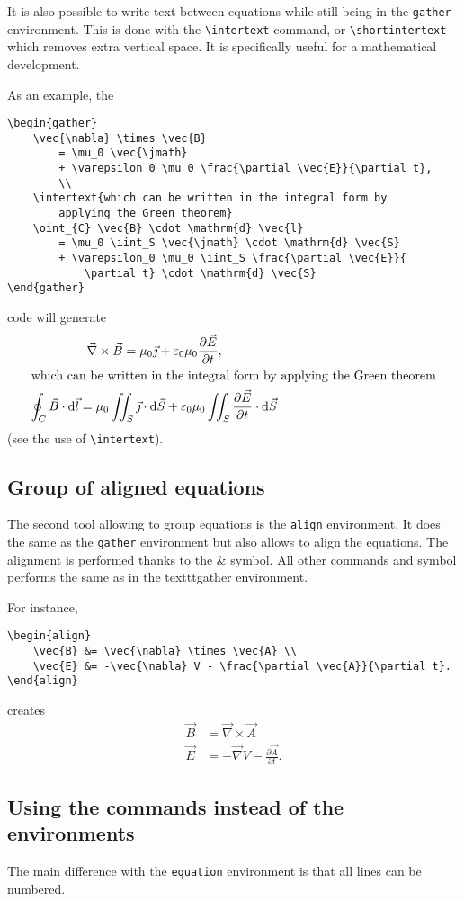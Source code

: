 		It is also possible to write text between equations while still being in the \texttt{gather} environment.
		This is done with the \texttt{\textbackslash{}intertext} command, or \texttt{\textbackslash{}shortintertext} which removes extra vertical space.
		It is specifically useful for a mathematical development.
		
		As an example, the	
\begin{lstlisting}[language={[LaTeX]TeX}]
\begin{gather}
	\vec{\nabla} \times \vec{B}
		= \mu_0 \vec{\jmath}
		+ \varepsilon_0 \mu_0 \frac{\partial \vec{E}}{\partial t},
		\\
	\intertext{which can be written in the integral form by 
		applying the Green theorem}
	\oint_{C} \vec{B} \cdot \mathrm{d} \vec{l}
		= \mu_0 \iint_S \vec{\jmath} \cdot \mathrm{d} \vec{S}
		+ \varepsilon_0 \mu_0 \iint_S \frac{\partial \vec{E}}{
			\partial t}	\cdot \mathrm{d} \vec{S}
\end{gather}
\end{lstlisting}	
		code will generate
		\begin{gather}
			\vec{\nabla} \times \vec{B}
				= \mu_0 \vec{\jmath}
				+ \varepsilon_0 \mu_0 \frac{\partial \vec{E}}{\partial t},
				\\
			\intertext{which can be written in the integral form by applying the Green theorem}
			\oint_{C} \vec{B} \cdot \mathrm{d} \vec{l}
				= \mu_0 \iint_S \vec{\jmath} \cdot \mathrm{d} \vec{S}
				+ \varepsilon_0 \mu_0 \iint_S \frac{\partial \vec{E}}{\partial t} \cdot \mathrm{d} \vec{S}
		\end{gather}
		(see the use of \texttt{\textbackslash{}intertext}).
	
	
	\subsection{Group of aligned equations}
	
		The second tool allowing to group equations is the \texttt{align} environment.
		It does the same as the \texttt{gather} environment but also allows to align the equations.
		The alignment is performed thanks to the \& symbol.
		All other commands and symbol performs the same as in the texttt{gather} environment.
		
		For instance,
\begin{lstlisting}[language={[LaTeX]TeX}]
\begin{align}
	\vec{B} &= \vec{\nabla} \times \vec{A} \\
	\vec{E} &= -\vec{\nabla} V - \frac{\partial \vec{A}}{\partial t}.
\end{align}
\end{lstlisting}
		creates
		\begin{align}
			\vec{B} &= \vec{\nabla} \times \vec{A} \\
			\vec{E} &= -\vec{\nabla} V - \frac{\partial \vec{A}}{\partial t}.
		\end{align}
	
	
	\subsection{Using the commands instead of the environments}
	
		The main difference with the \texttt{equation} environment is that all lines can be numbered.


